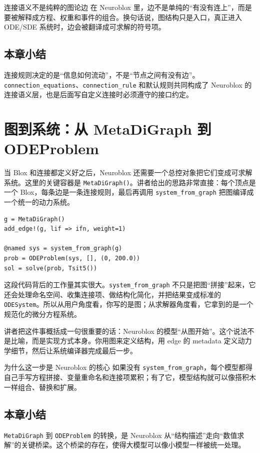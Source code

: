 \documentclass[a4paper]{article}
\begin{document}
\begin{warningbox}{连接语义不是纯粹的图论边}
在 Neuroblox 里，边不是单纯的“有没有连上”，而是要被解释成方程、权重和事件的组合。换句话说，图结构只是入口，真正进入 ODE/SDE 系统时，边会被翻译成可求解的符号项。
\end{warningbox}

\subsection{本章小结}
连接规则决定的是“信息如何流动”，不是“节点之间有没有边”。\texttt{connection\_equations}、\texttt{connection\_rule} 和默认规则共同构成了 Neuroblox 的连接语义层，也是后面写自定义连接时必须遵守的接口约定。

\section{图到系统：从 MetaDiGraph 到 ODEProblem}
当 Blox 和连接都定义好之后，Neuroblox 还需要一个总控对象把它们变成可求解系统。这里的关键容器是 \texttt{MetaDiGraph()}。讲者给出的思路非常直接：每个顶点是一个 Blox，每条边是一条连接规则，最后再调用 \texttt{system\_from\_graph} 把图编译成一个统一的动力系统。

\begin{lstlisting}[caption={把两个 neuron 连接成一个可求解系统}]
g = MetaDiGraph()
add_edge!(g, lif => ifn, weight=1)

@named sys = system_from_graph(g)
prob = ODEProblem(sys, [], (0, 200.0))
sol = solve(prob, Tsit5())
\end{lstlisting}

这段代码背后的工作量其实很大。\texttt{system\_from\_graph} 不只是把图“拼接”起来，它还会处理命名空间、收集连接项、做结构化简化，并把结果变成标准的 \texttt{ODESystem}。所以从用户角度看，你写的是图；从求解器角度看，它拿到的是一个规范化的微分方程系统。

讲者把这件事概括成一句很重要的话：Neuroblox 的模型“从图开始”。这个说法不是比喻，而是实现方式本身。你用图来定义结构，用 edge 的 metadata 定义动力学细节，然后让系统编译器完成最后一步。

\begin{knowledgebox}{为什么这一步是 Neuroblox 的核心}
如果没有 \texttt{system\_from\_graph}，每个模型都得自己手写方程拼接、变量重命名和连接项累积；有了它，模型结构就可以像搭积木一样组合、替换和扩展。
\end{knowledgebox}

\subsection{本章小结}
\texttt{MetaDiGraph} 到 \texttt{ODEProblem} 的转换，是 Neuroblox 从“结构描述”走向“数值求解”的关键桥梁。这个桥梁的存在，使得大模型可以像小模型一样被统一处理。
\end{document}
